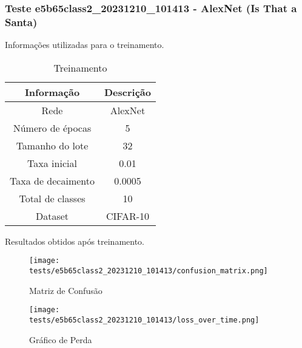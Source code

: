 \subsubsection{Teste e5b65class2_20231210_101413 - AlexNet (Is That a Santa)}

Informações utilizadas para o treinamento.

\begin{table}[ht]
   \centering
   \caption{Treinamento}
   \label{tab:modelos}
   \begin{tabular}{| c | c | }
      \hline 
      \textbf{Informação} & \textbf{Descrição} \\
      \hline \hline 
      Rede & AlexNet \\
      \hline
      Número de épocas & 5\\
      \hline
      Tamanho do lote & 32\\
      \hline
      Taxa inicial & 0.01 \\
      \hline
      Taxa de decaimento & 0.0005 \\
      \hline
      Total de classes & 10\\
      \hline
      Dataset & CIFAR-10\\
      \hline
   \end{tabular} 
\end{table}

Resultados obtidos após treinamento.


\begin{figure}[ht]
 \begin{center}
   \texttt{[image: tests/e5b65class2\_20231210\_101413/confusion\_matrix.png]}
  \caption{Matriz de Confusão}
  \label{fig:fig03}
 \end{center}
\end{figure}

\begin{figure}[ht]
 \begin{center}
   \texttt{[image: tests/e5b65class2\_20231210\_101413/loss\_over\_time.png]}
  \caption{Gráfico de Perda}
  \label{fig:fig04}
 \end{center}
\end{figure}

